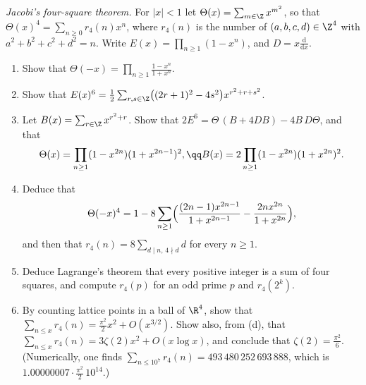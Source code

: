 \begin{exercise}[Journey]\label{pb:jacobi}
\emph{Jacobi's four-square theorem.} For $|x|<1$ let $\Theta(x)=\sum_{m\in\Z}x^{m^2}$, so that $\Theta(x)^4=\sum_{n\ge0}r_4(n)x^n$, where $r_4(n)$ is the number of
$(a,b,c,d)\in\Z^4$ with $a^2+b^2+c^2+d^2=n$. Write $E(x)=\prod_{n\ge1}(1-x^n)$, and $D=x\frac{\mathrm d}{\mathrm dx}$.
\begin{enumerate}[label=(\alph*)]
\item Show that $\Theta(-x)=\prod_{n\ge1}\frac{1-x^n}{1+x^n}$.
\item Show that $E(x)^6=\frac12\sum_{r,s\in\Z}\bigl((2r+1)^2-4s^2\bigr)x^{r^2+r+s^2}$.
\item Let $B(x)=\sum_{r\in\Z}x^{r^2+r}$. Show that $2E^6=\Theta\,(B+4DB)-4B\,D\Theta$, and that
\[
\Theta(x)=\prod_{n\ge1}(1-x^{2n})(1+x^{2n-1})^2,\qq B(x)=2\prod_{n\ge1}(1-x^{2n})(1+x^{2n})^2.
\]
\item Deduce that
\[
\Theta(-x)^4=1-8\sum_{n\ge1}\Bigl(\frac{(2n-1)x^{2n-1}}{1+x^{2n-1}}-\frac{2nx^{2n}}{1+x^{2n}}\Bigr),
\]
and then that $r_4(n)=8\sum_{d\mid n,\,4\nmid d}d$ for every $n\ge1$.
\item Deduce Lagrange's theorem that every positive integer is a sum of four squares, and compute $r_4(p)$ for an odd prime $p$ and $r_4(2^k)$.
\item By counting lattice points in a ball of $\R^4$, show that $\sum_{n\le x}r_4(n)=\frac{\pi^2}2x^2+O(x^{3/2})$. Show also, from (d), that
$\sum_{n\le x}r_4(n)=3\zeta(2)x^2+O(x\log x)$, and conclude that $\zeta(2)=\frac{\pi^2}6$. (Numerically, one finds $\sum_{n\le10^7}r_4(n)=493\,480\,252\,693\,888$, which is
$1.00000007\cdot\frac{\pi^2}2\,10^{14}$.)
\end{enumerate}
\end{exercise}

